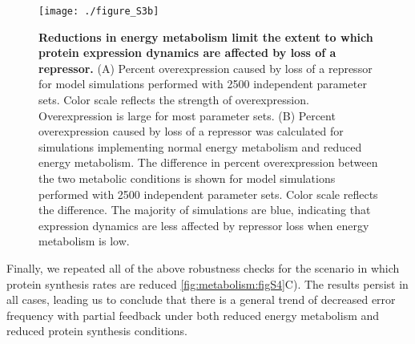 \begin{figure}[h!]
\centering
\texttt{[image: ./figure\_S3b]}
\caption[Reduced metabolism desensitizes protein dynamics to repression.]{\textbf{Reductions in energy metabolism limit the extent to which protein expression dynamics are affected by loss of a repressor.} (A) Percent overexpression caused by loss of a repressor for model simulations performed with 2500 independent parameter sets. Color scale reflects the strength of overexpression. Overexpression is large for most parameter sets. (B) Percent overexpression caused by loss of a repressor was calculated for simulations implementing normal energy metabolism and reduced energy metabolism. The difference in percent overexpression between the two metabolic conditions is shown for model simulations performed with 2500 independent parameter sets. Color scale reflects the difference. The majority of simulations are blue, indicating that expression dynamics are less affected by repressor loss when energy metabolism is low.}
\label{fig:metabolism:figS3b}
\end{figure}

Finally, we repeated all of the above robustness checks for the scenario in which protein synthesis rates are reduced \ref{fig:metabolism:figS4}C). The results persist in all cases, leading us to conclude that there is a general trend of decreased error frequency with partial feedback under both reduced energy metabolism and reduced protein synthesis conditions.

